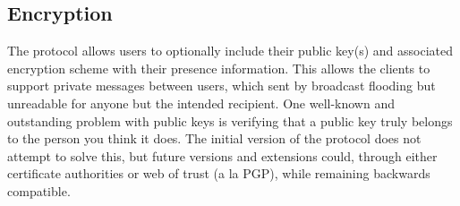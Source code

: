 \documentclass{article}
\begin{document}
\subsection{Encryption}

The protocol allows users to optionally include their public key(s) and
associated encryption scheme with their presence information. This allows the
clients to support private messages between users, which sent by broadcast
flooding but unreadable for anyone but the intended recipient. One well-known
and outstanding problem with public keys is verifying that a public key truly
belongs to the person you think it does. The initial version of the protocol
does not attempt to solve this, but future versions and extensions could,
through either certificate authorities or web of trust (a la PGP), while
remaining backwards compatible.
\end{document}
